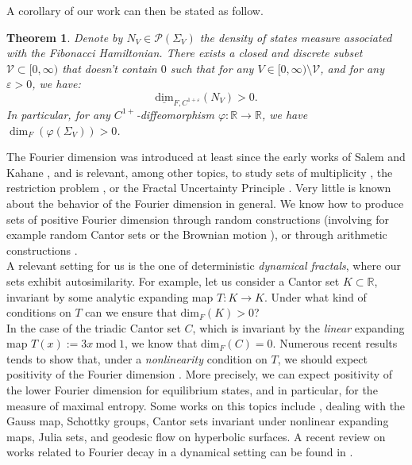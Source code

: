 \documentclass[a4paper]{article}
\newtheorem{theorem}{Theorem}[section]
\theoremstyle{definition}
\begin{document}
A corollary of our work can then be stated as follow.

\begin{theorem}\label{th:IDS2}
Denote by $N_V \in \mathcal{P}(\Sigma_V)$ the density of states measure associated with the Fibonacci Hamiltonian. There exists a closed and discrete subset $\mathcal{V}\subset [0,\infty)$ that doesn't contain $0$ such that for any $V \in [0,\infty) \setminus \mathcal{V}$, and for any $\varepsilon>0$, we have:
$$ \underline{\text{dim}}_{F,C^{1+\varepsilon}}(N_V)>0 .$$
In particular, for any $C^{1+}$-diffeomorphism $\varphi:\mathbb{R} \rightarrow \mathbb{R}$, we have $\dim_F(\varphi(\Sigma_V)) > 0$.
\end{theorem}


The Fourier dimension was introduced at least since the early works of Salem and Kahane \cite{Sa43,Sa51,Ka66a,Ka66b}, and is relevant, among other topics, to study sets of multiplicity \cite{KS64,Kö92}, the restriction problem \cite{Ma15,ŁW16}, or the Fractal Uncertainty Principle \cite{BD17,BS23}. Very little is known about the behavior of the Fourier dimension in general. We know how to produce sets of positive Fourier dimension through random constructions (involving for example random Cantor sets \cite{Bl96} or the Brownian motion \cite{Ka85}), or through arithmetic constructions \cite{Ka81,Ha17,FH23}. \\

A relevant setting for us is the one of deterministic \emph{dynamical fractals}, where our sets exhibit autosimilarity. For example, let us consider a Cantor set $K \subset \mathbb{R}$, invariant by some analytic expanding map $T : K \rightarrow K$. Under what kind of conditions on $T$ can we ensure that $\text{dim}_F(K) > 0$? \\
In the case of the triadic Cantor set $C$, which is invariant by the \emph{linear} expanding map $T(x) := 3x \ \text{mod} \ 1$, we know that $\text{dim}_F(C)= 0$. Numerous recent results tends to show that, under a \emph{nonlinearity} condition on $T$, we should expect positivity of the Fourier dimension \cite{Le24}. More precisely, we can expect positivity of the lower Fourier dimension for equilibrium states, and in particular, for the measure of maximal entropy. Some works on this topics include \cite{Ka80,QR03,BD17,LNP19,SS20,Li20,Le21,Le22,Le23b,LPS25}, dealing with the Gauss map, Schottky groups, Cantor sets invariant under nonlinear expanding maps, Julia sets, and geodesic flow on hyperbolic surfaces. A recent review on works related to Fourier decay in a dynamical setting can be found in \cite{Sah23}. \\
\end{document}
